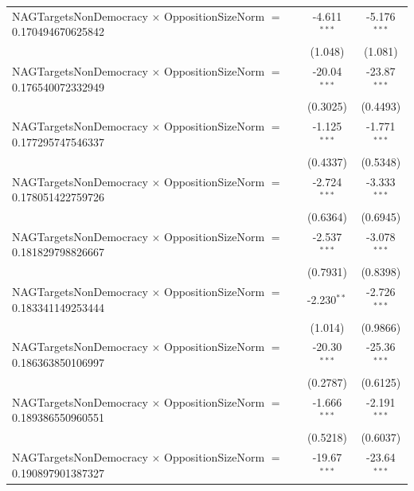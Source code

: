 \begin{tabular}{lcc}
   NAGTargetsNonDemocracy $\times$ OppositionSizeNorm $=$ 0.170494670625842     & -4.611$^{***}$       & -5.176$^{***}$\\   
                                                                                & (1.048)              & (1.081)\\   
   NAGTargetsNonDemocracy $\times$ OppositionSizeNorm $=$ 0.176540072332949     & -20.04$^{***}$       & -23.87$^{***}$\\   
                                                                                & (0.3025)             & (0.4493)\\   
   NAGTargetsNonDemocracy $\times$ OppositionSizeNorm $=$ 0.177295747546337     & -1.125$^{***}$       & -1.771$^{***}$\\   
                                                                                & (0.4337)             & (0.5348)\\   
   NAGTargetsNonDemocracy $\times$ OppositionSizeNorm $=$ 0.178051422759726     & -2.724$^{***}$       & -3.333$^{***}$\\   
                                                                                & (0.6364)             & (0.6945)\\   
   NAGTargetsNonDemocracy $\times$ OppositionSizeNorm $=$ 0.181829798826667     & -2.537$^{***}$       & -3.078$^{***}$\\   
                                                                                & (0.7931)             & (0.8398)\\   
   NAGTargetsNonDemocracy $\times$ OppositionSizeNorm $=$ 0.183341149253444     & -2.230$^{**}$        & -2.726$^{***}$\\   
                                                                                & (1.014)              & (0.9866)\\   
   NAGTargetsNonDemocracy $\times$ OppositionSizeNorm $=$ 0.186363850106997     & -20.30$^{***}$       & -25.36$^{***}$\\   
                                                                                & (0.2787)             & (0.6125)\\   
   NAGTargetsNonDemocracy $\times$ OppositionSizeNorm $=$ 0.189386550960551     & -1.666$^{***}$       & -2.191$^{***}$\\   
                                                                                & (0.5218)             & (0.6037)\\   
   NAGTargetsNonDemocracy $\times$ OppositionSizeNorm $=$ 0.190897901387327     & -19.67$^{***}$       & -23.64$^{***}$\\   

\end{tabular}
